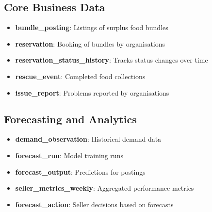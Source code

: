 \documentclass[12pt]{article}
\begin{document}
\subsection{Core Business Data}
\begin{itemize}
\item \textbf{bundle\_posting}: Listings of surplus food bundles
\item \textbf{reservation}: Booking of bundles by organisations
\item \textbf{reservation\_status\_history}: Tracks status changes over time
\item \textbf{rescue\_event}: Completed food collections
\item \textbf{issue\_report}: Problems reported by organisations
\end{itemize}

\subsection{Forecasting and Analytics}
\begin{itemize}
\item \textbf{demand\_observation}: Historical demand data
\item \textbf{forecast\_run}: Model training runs
\item \textbf{forecast\_output}: Predictions for postings
\item \textbf{seller\_metrics\_weekly}: Aggregated performance metrics
\item \textbf{forecast\_action}: Seller decisions based on forecasts
\end{itemize}
\end{document}
